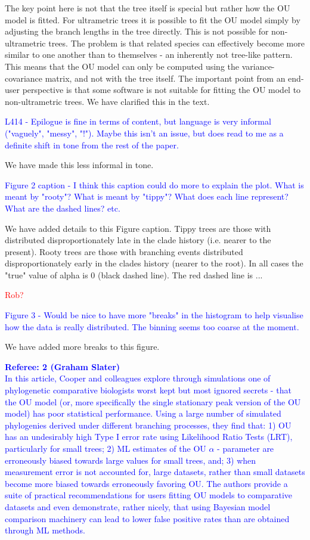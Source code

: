 \documentclass[12pt]{letter}
\begin{document}
\begin{letter}{}
The key point here is not that the tree itself is special but rather how the OU model is fitted. For ultrametric trees it is possible to fit the OU model simply by adjusting the branch lengths in the tree directly. This is not possible for non-ultrametric trees. The problem is that related species can effectively become more similar to one another than to themselves - an inherently not tree-like pattern. This means that the OU model can only be computed using the variance-covariance matrix, and not with the tree itself. The important point from an end-user perspective is that some software is not suitable for fitting the OU model to non-ultrametric trees. We have clarified this in the text.

\textcolor{blue}{L414 - Epilogue is fine in terms of content, but language is very informal ("vaguely", "messy", "!"). Maybe this isn't an issue, but does read to me as a definite shift in tone from the rest of the paper.}

We have made this less informal in tone.

\textcolor{blue}{Figure 2 caption - I think this caption could do more to explain the plot. What is meant by "rooty"? What is meant by "tippy"? What does each line represent? What are the dashed lines? etc.}

We have added details to this Figure caption. Tippy trees are those with distributed disproportionately late in the clade history (i.e. nearer to the present). Rooty trees are those with branching events distributed disproportionately early in the clades history (nearer to the root). In all cases the "true" value of alpha is 0 (black dashed line). The red dashed line is ... %

\textcolor{red}{Rob?}

\textcolor{blue}{Figure 3 - Would be nice to have more "breaks" in the histogram to help visualise how the data is really distributed. The binning seems too coarse at the moment.}

We have added more breaks to this figure.

\textcolor{blue}{\textbf{Referee: 2 (Graham Slater)}\\
In this article, Cooper and colleagues explore through simulations one of phylogenetic comparative biologists worst kept but most ignored secrets - that the OU model (or, more specifically the single stationary peak version of the OU model) has poor statistical performance. Using a large number of simulated phylogenies derived under different branching processes, they find that: 1) OU has an undesirably high Type I error rate using Likelihood Ratio Tests (LRT), particularly for small trees; 2) ML estimates of the OU $\alpha$ - parameter are erroneously biased towards large values for small trees, and; 3) when measurement error is not accounted for, large datasets, rather than small datasets become more biased towards erroneously favoring OU. The authors provide a suite of practical recommendations for users fitting OU models to comparative datasets and even demonstrate, rather nicely, that using Bayesian model comparison machinery can lead to lower false positive rates than are obtained through ML methods.}


\end{letter}
\end{document}
